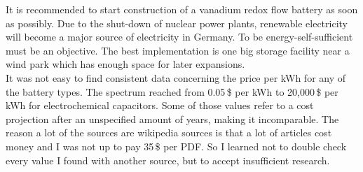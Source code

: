 \begin{parcolumns}[colwidths={1=2.5 cm, 2=10 cm, 3=2.5cm}]{3}
{It is recommended to start construction of a vanadium redox flow battery as soon as possibly. Due to the shut-down of nuclear power plants, renewable electricity will become  a major source of electricity in Germany. To be energy-self-sufficient must be an objective. The best implementation is one big storage facility near a wind park which has enough space for later expansions. \\
It was not easy to find consistent data concerning the price per kWh for any of the battery types. The spectrum reached from 0.05\,\$ per kWh to 20,000\,\$ per kWh for electrochemical capacitors. Some of those values refer to a cost projection after an unspecified amount of years, making it incomparable. The reason a lot of the sources are wikipedia sources is that a lot of articles cost money and I was not up to pay 35\,\$ per PDF. So I learned not to double check every value I found with another source, but to accept insufficient research.


}


\end{parcolumns}
